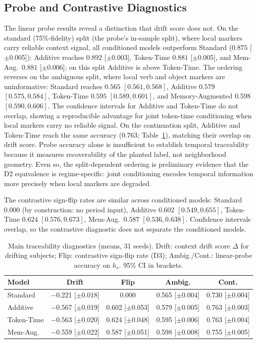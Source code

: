 \documentclass[runningheads]{llncs}
\begin{document}
\subsection{Probe and Contrastive Diagnostics}
The linear probe results reveal a distinction that drift score does not.
On the standard (75\%-fidelity) split (the probe's in-sample split), where
local markers carry reliable context signal, all conditioned models outperform
Standard
(\(0.875\) [\(\pm\)0.005]): Additive reaches \(0.892\) [\(\pm\)0.003],
Token-Time \(0.881\) [\(\pm\)0.005], and Mem-Aug.\ \(0.881\) [\(\pm\)0.006];
on this split Additive is above Token-Time. The ordering reverses on the
ambiguous split, where local verb and object markers are uninformative: Standard
reaches \(0.565\) \([0.561, 0.568]\), Additive \(0.579\) \([0.575, 0.584]\),
Token-Time \(0.595\) \([0.589, 0.601]\), and Memory-Augmented \(0.598\)
\([0.590, 0.606]\). The confidence intervals for Additive and Token-Time do not
overlap, showing a reproducible advantage for joint token-time conditioning when
local markers carry no reliable signal. On the continuation split,
Additive and Token-Time reach the same accuracy (\(0.763\); Table~\ref{tab:main-results}),
matching their overlap on drift score. Probe accuracy alone is insufficient to establish temporal traceability because
it measures recoverability of the planted label, not neighborhood geometry.
Even so, the split-dependent ordering is preliminary evidence that the D2
equivalence is regime-specific: joint conditioning encodes temporal information
more precisely when local markers are degraded.

The contrastive sign-flip rates are similar across conditioned models: Standard
\(0.000\) (by construction: no period input), Additive \(0.602\) \([0.549, 0.655]\), Token-Time \(0.624\)
\([0.576, 0.673]\), Mem-Aug.\ \(0.587\) \([0.536, 0.638]\). Confidence
intervals overlap, so the contrastive diagnostic does not separate the
conditioned models.
\begin{table}[t]
\caption{Main traceability diagnostics (means, 31 seeds). Drift: context drift
score \(\Delta\) for drifting subjects; Flip: contrastive sign-flip rate (D3);
Ambig./Cont.: linear-probe accuracy on \(h_s\). 95\% CI in brackets.}
\label{tab:main-results}
\centering
\scriptsize
\renewcommand{\arraystretch}{0.88}
\setlength{\tabcolsep}{4pt}
\begin{tabular}{lcccc}
\toprule
\textbf{Model} & \textbf{Drift} & \textbf{Flip} & \textbf{Ambig.} & \textbf{Cont.} \\
\midrule
Standard & $-$0.221 [$\pm$0.018] & 0.000 & 0.565 [$\pm$0.004] & 0.730 [$\pm$0.004] \\
Additive & $-$0.567 [$\pm$0.019] & 0.602 [$\pm$0.053] & 0.579 [$\pm$0.005] & 0.763 [$\pm$0.003] \\
Token-Time    & $-$0.563 [$\pm$0.020] & 0.624 [$\pm$0.048] & 0.595 [$\pm$0.006] & 0.763 [$\pm$0.004] \\
Mem-Aug. & $-$0.559 [$\pm$0.022] & 0.587 [$\pm$0.051] & 0.598 [$\pm$0.008] & 0.755 [$\pm$0.005] \\
\bottomrule
\end{tabular}
\end{table}
\end{document}
